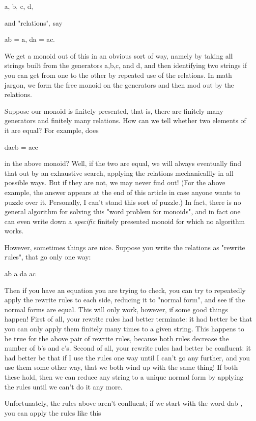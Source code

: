 a, b, c, d,

and "relations", say 

ab = a, da = ac.

We get a monoid out of this in an obvious sort of way, namely by taking
all strings built from the generators a,b,c, and d, and then identifying
two strings if you can get from one to the other by repeated use of the
relations.  In math jargon, we form the free monoid on the generators
and then mod out by the relations.  

Suppose our monoid is finitely presented, that is, there are finitely
many generators and finitely many relations.  How can we tell whether
two elements of it are equal?  For example, does

dacb = acc 

in the above monoid?  Well, if the two are equal, we will always
eventually find that out by an exhaustive search, applying the relations
mechanicallly in all possible ways.  But if they are not, we may never
find out!  (For the above example, the answer appears at the end of this
article in case anyone wants to puzzle over it.  Personally, I can't
stand this sort of puzzle.)  In fact, there is no general algorithm for
solving this "word problem for monoids", and in fact one can even write
down a \emph{specific} finitely presented monoid for which no algorithm
works.  

However, sometimes things are nice.  Suppose you write the relations
as "rewrite rules", that go only one way:

ab \to  a
da \to  ac

Then if you have an equation you are trying to check, you can try to
repeatedly apply the rewrite rules to each side, reducing it to "normal
form", and see if the normal forms are equal.  This will only work,
however, if some good things happen!  First of all, your rewrite rules
had better terminate: it had better be that you can only apply them
finitely many times to a given string.  This happens to be true for
the above pair of rewrite rules, because both rules decrease the number
of b's and c's.  Second of all, your rewrite rules had better be
confluent: it had better be that if I use the rules one way until I
can't go any further, and you use them some other way, that we both wind
up with the same thing!  If both these hold, then we can reduce any
string to a unique normal form by applying the rules until we can't do
it any more.  

Unfortunately, the rules above aren't confluent; if we start with 
the word  dab , you can apply the rules like this

